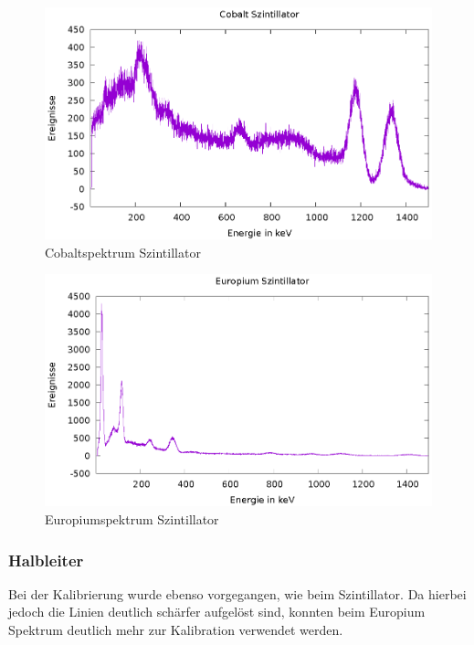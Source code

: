\documentclass[12pt,a4paper,titlepage]{article}
\begin{document}
\begin{figure}
	\centering
	\includegraphics{cobalt_sz_energie}
	\caption{Cobaltspektrum Szintillator}
	\label{fig:co_sz}
\end{figure}
\begin{figure}
	\centering
	\includegraphics{europium_sz_energie}
	\caption{Europiumspektrum Szintillator}
	\label{fig:eu_sz}
\end{figure}

\subsubsection{Halbleiter}
Bei der Kalibrierung wurde ebenso vorgegangen, wie beim Szintillator. Da hierbei jedoch die Linien deutlich schärfer aufgelöst sind, konnten beim Europium Spektrum deutlich mehr zur Kalibration verwendet werden.
\end{document}
